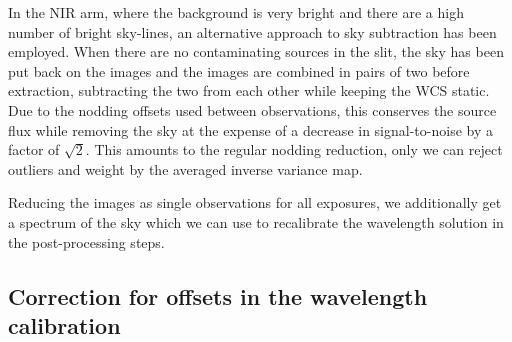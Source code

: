 \documentclass[longauth]{aa}    %
\begin{document}
In the NIR arm, where the background is very bright and there are a high number
of bright sky-lines, an alternative approach to sky subtraction has been
employed. When there are no contaminating sources in the slit, the sky has been
put back on the images and the images are combined in pairs of two before
extraction, subtracting the two from each other while keeping the WCS static.
Due to the nodding offsets used between observations, this conserves the
source flux while removing the sky at the expense of a decrease in
signal-to-noise by a factor of $\sqrt{2}$. This amounts to the regular nodding
reduction, only we can reject outliers and weight by the averaged inverse
variance map.

Reducing the images as single observations for all exposures, we additionally
get a spectrum of the sky which we can use to recalibrate the wavelength
solution in the post-processing steps.


\subsection{Correction for offsets in the wavelength calibration}    \label{wavecal}
\end{document}
